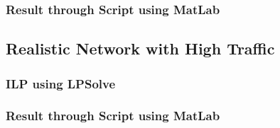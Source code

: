 \subsubsection{Result through Script using MatLab}


\subsection{Realistic Network with High Traffic}

\subsubsection{ILP using LPSolve}

\subsubsection{Result through Script using MatLab}


